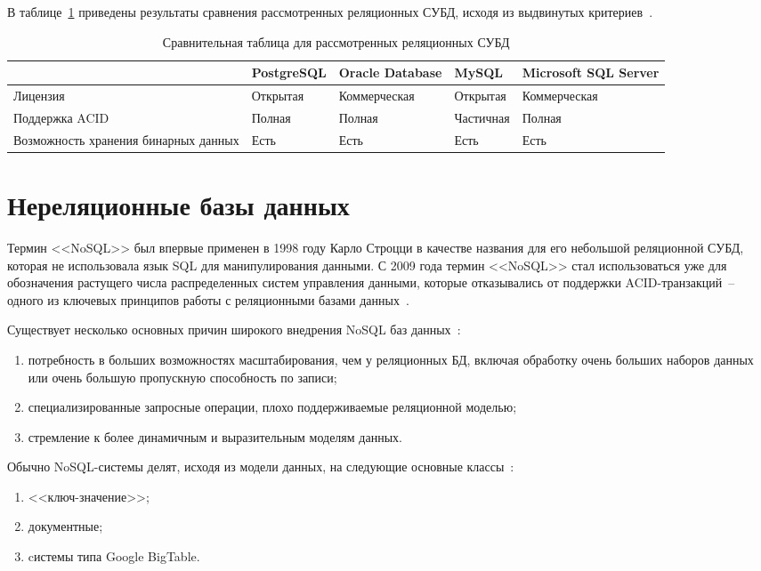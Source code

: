 В таблице~\ref{table:compareRelDBs} приведены результаты сравнения рассмотренных реляционных СУБД, исходя из выдвинутых критериев~\cite{cmpSCDB6}.
\begin{table}[h!]
	\begin{center}
		\caption{\label{table:compareRelDBs} Сравнительная таблица для рассмотренных реляционных СУБД}
		\begin{tabularx}{\textwidth}{|X|X|X|X|X|}
			\hline
			~ & PostgreSQL & Oracle Database & MySQL & Microsoft SQL Server \\ \hline
			Лицензия & Открытая & Коммерческая & Открытая & Коммерческая \\ \hline
			Поддержка ACID & Полная & Полная & Частичная & Полная \\ \hline
			Возможность хранения бинарных данных & Есть & Есть & Есть & Есть \\ \hline
		\end{tabularx}
	\end{center}
\end{table}

\section{Нереляционные базы данных}

Термин <<NoSQL>> был впервые применен в 1998 году Карло Строцци в качестве названия для его небольшой реляционной СУБД, которая не использовала язык SQL для манипулирования данными.
С 2009 года термин <<NoSQL>> стал использоваться уже для обозначения растущего числа распределенных систем управления данными, которые отказывались от поддержки ACID-транзакций~-- одного из ключевых принципов работы с реляционными базами данных~\cite{nosql}.

Существует несколько основных причин широкого внедрения NoSQL баз данных~\cite{highloadApps}:
\begin{enumerate}
	\item потребность в больших возможностях масштабирования, чем у реляционных БД, включая обработку очень больших наборов данных или очень большую пропускную способность по записи;
	\item специализированные запросные операции, плохо поддерживаемые реляционной моделью;
	\item стремление к более динамичным и выразительным моделям данных.
\end{enumerate}

Обычно NoSQL-системы делят, исходя из модели данных, на следующие основные классы~\cite{nosql}:
\begin{enumerate}
	\item <<ключ-значение>>;
	\item документные;
	\item cистемы типа Google BigTable.
\end{enumerate}

